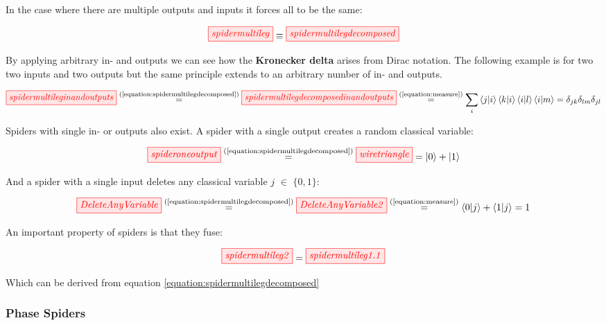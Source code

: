 \documentclass[]{article}
\newcommand{\equaltext}[1]{\ensuremath{\stackrel{\text{#1}}{=}}}
\begin{document}
In the case where there are multiple outputs and inputs it forces all to be the same:

\begin{equation}
\label{equation:spidermultilegdecomposed}
\tikzfig{spidermultileg} \equiv \tikzfig{spidermultilegdecomposed}
\end{equation}

By applying arbitrary in- and outputs we can see how the \textbf{Kronecker delta} arises from Dirac notation. The following example is for two two inputs and two outputs but the same principle extends to an arbitrary number of in- and outputs.

\begin{equation}
\begin{split}
\tikzfig{spidermultileginandoutputs} \equaltext{(\ref{equation:spidermultilegdecomposed})} \tikzfig{spidermultilegdecomposedinandoutputs} \equaltext{(\ref{equation:measure})} \sum_{i} \bra{j}\ket{i}\bra{k}\ket{i}\bra{i}\ket{l}\bra{i}\ket{m} = \delta_{jk} \delta_{lm}  \delta_{jl}
\end{split}
\end{equation}

Spiders with single in- or outputs also exist. A spider with a single output creates a random classical variable:

\begin{equation}
\label{equation:spideroneoutput}
\tikzfig{spideroneoutput} \equaltext{(\ref{equation:spidermultilegdecomposed})} \tikzfig{wiretriangle} = \ket{0} + \ket{1}
\end{equation}

And a spider with a single input deletes any classical variable $j$ $\in$ $\{0,1\}$:

\begin{equation}
 \tikzfig{DeleteAnyVariable} \equaltext{(\ref{equation:spidermultilegdecomposed})} \tikzfig{DeleteAnyVariable2} \equaltext{(\ref{equation:measure})}  \bra{0}\ket{j} + \bra{1}\ket{j} = 1
\end{equation}

An important property of spiders is that they fuse:

\begin{equation}
\label{equation:spiderfusion}
	\tikzfig{spidermultileg2} = \tikzfig{spidermultileg1.1}
\end{equation}

Which can be derived from equation \ref{equation:spidermultilegdecomposed}

\subsubsection{Phase Spiders}
\label{phasespiders}
\end{document}
